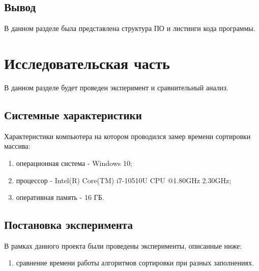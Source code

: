 \documentclass[a4paper, 12pt]{article}
\begin{document}
\begin{flushleft}
	\subsection{Вывод}
	\hspace*{5mm} В данном разделе была представлена структура ПО и листинги кода программы. 
	
\end{flushleft}

\newpage
\section{Исследовательская часть }
\begin{flushleft}
	\hspace*{5mm} В данном разделе будет проведен эксперимент и сравнительный анализ.
	\subsection{Системные характеристики}
	Характеристики компьютера на котором проводился замер времени сортировки массива:
	\begin{enumerate}
		\item операционная система - Windows 10;
		\item процессор - Intel(R) Core(TM) i7-10510U CPU @1.80GHz 2.30GHz;
		\item оперативная память - 16 ГБ.
	\end{enumerate}
	\subsection{Постановка эксперимента}
	В рамках данного проекта были проведены эксперименты, описанные ниже:
	\begin{enumerate}
		\item сравнение времени работы алгоритмов сортировки при разных заполнениях.
	\end{enumerate}

\end{flushleft}
\end{document}
